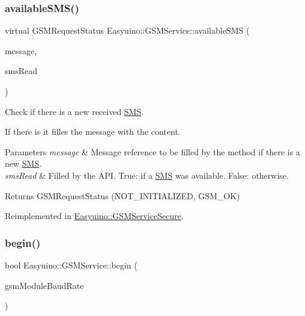 \subsubsection{\texorpdfstring{available\+S\+M\+S()}{availableSMS()}}
{\footnotesize\ttfamily virtual G\+S\+M\+Request\+Status Easyuino\+::\+G\+S\+M\+Service\+::available\+S\+MS (\begin{DoxyParamCaption}\item[{O\+UT \hyperlink{class_easyuino_1_1_s_m_s}{S\+MS} \&}]{message,  }\item[{O\+UT bool \&}]{sms\+Read }\end{DoxyParamCaption})\hspace{0.3cm}{\ttfamily [virtual]}}



Check if there is a new received \hyperlink{class_easyuino_1_1_s_m_s}{S\+MS}. 

If there is it filles the message with the content. 
\begin{DoxyParams}{Parameters}
{\em message} & Message reference to be filled by the method if there is a new \hyperlink{class_easyuino_1_1_s_m_s}{S\+MS}. \\
\hline
{\em sms\+Read} & Filled by the A\+PI. True\+: if a \hyperlink{class_easyuino_1_1_s_m_s}{S\+MS} was available. False\+: otherwise. \\
\hline
\end{DoxyParams}
\begin{DoxyReturn}{Returns}
G\+S\+M\+Request\+Status (N\+O\+T\+\_\+\+I\+N\+I\+T\+I\+A\+L\+I\+Z\+ED, G\+S\+M\+\_\+\+OK) 
\end{DoxyReturn}


Reimplemented in \hyperlink{class_easyuino_1_1_g_s_m_service_secure_a42177d8a9943f30a2b63f9bc51a5370d}{Easyuino\+::\+G\+S\+M\+Service\+Secure}.

\mbox{\label{class_easyuino_1_1_g_s_m_service_a49dd695dba030b168464f620c3d96ee0}} 
\subsubsection{\texorpdfstring{begin()}{begin()}\hspace{0.1cm}{\footnotesize\ttfamily [1/2]}}
{\footnotesize\ttfamily bool Easyuino\+::\+G\+S\+M\+Service\+::begin (\begin{DoxyParamCaption}\item[{IN unsigned long}]{gsm\+Module\+Baud\+Rate }\end{DoxyParamCaption})}



